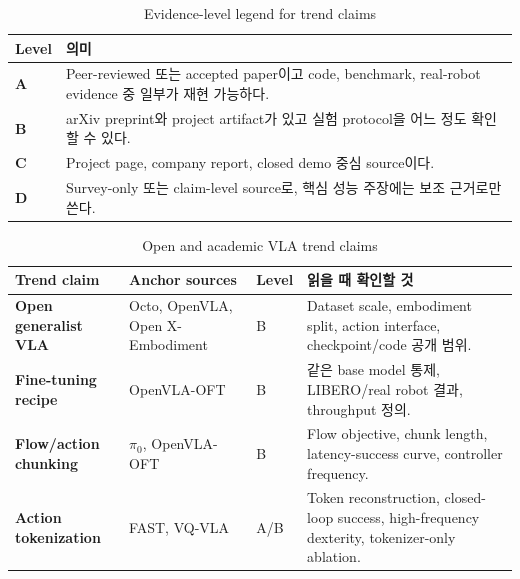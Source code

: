 \begin{table}[t]
  \centering
  \caption{Evidence-level legend for trend claims}
  \label{tab:trend_evidence_legend}
  \begin{tabularx}{\textwidth}{>{\bfseries}p{14mm}X}
    \toprule
    Level & 의미 \\
    \midrule
    A & Peer-reviewed 또는 accepted paper이고 code, benchmark, real-robot evidence 중 일부가 재현 가능하다. \\
    B & arXiv preprint와 project artifact가 있고 실험 protocol을 어느 정도 확인할 수 있다. \\
    C & Project page, company report, closed demo 중심 source이다. \\
    D & Survey-only 또는 claim-level source로, 핵심 성능 주장에는 보조 근거로만 쓴다. \\
    \bottomrule
  \end{tabularx}
\end{table}

\begin{table}[t]
  \centering
  \small
  \caption{Open and academic VLA trend claims}
  \label{tab:claim_source_mapping_open}
  \begin{tabularx}{\textwidth}{>{\bfseries}p{34mm}p{38mm}p{14mm}X}
    \toprule
    Trend claim & Anchor sources & Level & 읽을 때 확인할 것 \\
    \midrule
    Open generalist VLA & Octo, OpenVLA, Open X-Embodiment & B & Dataset scale, embodiment split, action interface, checkpoint/code 공개 범위. \\
    Fine-tuning recipe & OpenVLA-OFT & B & 같은 base model 통제, LIBERO/real robot 결과, throughput 정의. \\
    Flow/action chunking & \(\pi_0\), OpenVLA-OFT & B & Flow objective, chunk length, latency-success curve, controller frequency. \\
    Action tokenization & FAST, VQ-VLA & A/B & Token reconstruction, closed-loop success, high-frequency dexterity, tokenizer-only ablation. \\
    \bottomrule
  \end{tabularx}
\end{table}

